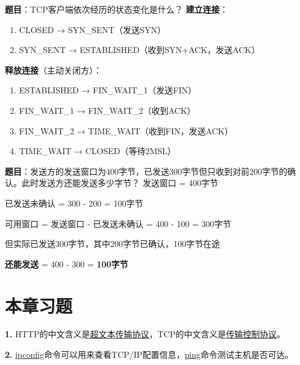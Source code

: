 \begin{examplebox}[例题5.7 TCP连接状态转换]
\textbf{题目}：TCP客户端依次经历的状态变化是什么？
\tcblower
\textbf{建立连接}：
\begin{enumerate}[itemsep=0pt]
    \item CLOSED → SYN\_SENT（发送SYN）
    \item SYN\_SENT → ESTABLISHED（收到SYN+ACK，发送ACK）
\end{enumerate}

\textbf{释放连接}（主动关闭方）：
\begin{enumerate}[itemsep=0pt]
    \item ESTABLISHED → FIN\_WAIT\_1（发送FIN）
    \item FIN\_WAIT\_1 → FIN\_WAIT\_2（收到ACK）
    \item FIN\_WAIT\_2 → TIME\_WAIT（收到FIN，发送ACK）
    \item TIME\_WAIT → CLOSED（等待2MSL）
\end{enumerate}
\end{examplebox}

\begin{examplebox}[例题5.8 滑动窗口]
\textbf{题目}：发送方的发送窗口为400字节，已发送300字节但只收到对前200字节的确认。此时发送方还能发送多少字节？
\tcblower
发送窗口 = 400字节

已发送未确认 = 300 - 200 = 100字节

可用窗口 = 发送窗口 - 已发送未确认 = 400 - 100 = 300字节

但实际已发送300字节，其中200字节已确认，100字节在途

\textbf{还能发送} = 400 - 300 = \textbf{100字节}
\end{examplebox}

\section{本章习题}

\begin{examplebox}[填空题]
\textbf{1.} HTTP的中文含义是\underline{超文本传输协议}，TCP的中文含义是\underline{传输控制协议}。

\textbf{2.} \underline{ipconfig}命令可以用来查看TCP/IP配置信息，\underline{ping}命令测试主机是否可达。
\end{examplebox}

